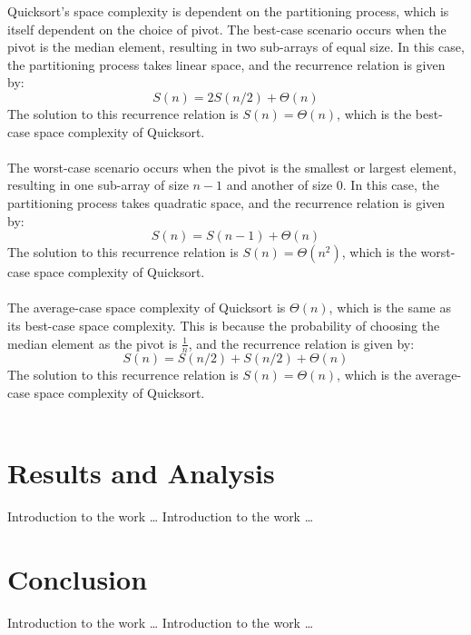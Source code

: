 \documentclass[a4paper,10pt,twocolumn]{article}
\begin{document}
Quicksort's space complexity is dependent on the partitioning process, which is itself dependent on the choice of pivot. The best-case scenario occurs when the pivot is the median element, resulting in two sub-arrays of equal size. In this case, the partitioning process takes linear space, and the recurrence relation is given by:
\begin{equation}
S(n) = 2S(n/2) + \Theta(n)
\end{equation}
The solution to this recurrence relation is $S(n) = \Theta(n)$, which is the best-case space complexity of Quicksort.\\\\
The worst-case scenario occurs when the pivot is the smallest or largest element, resulting in one sub-array of size $n-1$ and another of size $0$. In this case, the partitioning process takes quadratic space, and the recurrence relation is given by:
\begin{equation}
S(n) = S(n-1) + \Theta(n)
\end{equation}
The solution to this recurrence relation is $S(n) = \Theta(n^2)$, which is the worst-case space complexity of Quicksort.\\\\
The average-case space complexity of Quicksort is $\Theta(n)$, which is the same as its best-case space complexity. This is because the probability of choosing the median element as the pivot is $\frac{1}{n}$, and the recurrence relation is given by:
\begin{equation}
S(n) = S(n/2) + S(n/2) + \Theta(n)
\end{equation}
The solution to this recurrence relation is $S(n) = \Theta(n)$, which is the average-case space complexity of Quicksort.\\\\




\section{Results and Analysis}
Introduction to the work … Introduction to the work …

\section{Conclusion}
Introduction to the work … Introduction to the work …



\end{document}
